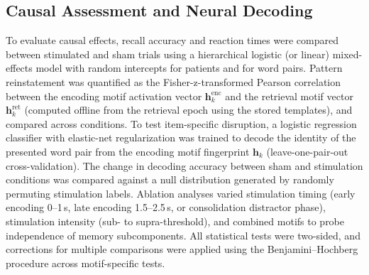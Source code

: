 \documentclass{article}
\begin{document}
\subsection{Causal Assessment and Neural Decoding}
To evaluate causal effects, recall accuracy and reaction times were compared between stimulated and sham trials using a hierarchical logistic (or linear) mixed-effects model with random intercepts for patients and for word pairs. Pattern reinstatement was quantified as the Fisher-z-transformed Pearson correlation between the encoding motif activation vector \(\mathbf{h}_k^{\text{enc}}\) and the retrieval motif vector \(\mathbf{h}_k^{\text{ret}}\) (computed offline from the retrieval epoch using the stored templates), and compared across conditions. To test item-specific disruption, a logistic regression classifier with elastic-net regularization was trained to decode the identity of the presented word pair from the encoding motif fingerprint \(\mathbf{h}_k\) (leave-one-pair-out cross-validation). The change in decoding accuracy between sham and stimulation conditions was compared against a null distribution generated by randomly permuting stimulation labels. Ablation analyses varied stimulation timing (early encoding 0–1\,s, late encoding 1.5–2.5\,s, or consolidation distractor phase), stimulation intensity (sub- to supra-threshold), and combined motifs to probe independence of memory subcomponents. All statistical tests were two-sided, and corrections for multiple comparisons were applied using the Benjamini–Hochberg procedure across motif-specific tests.



\end{document}
